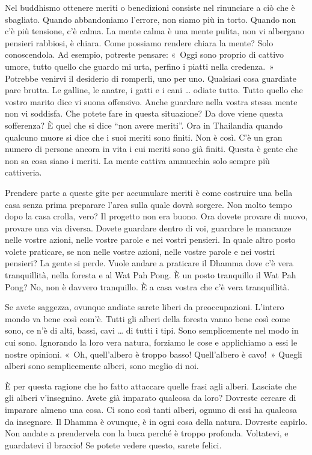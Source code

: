 Nel buddhismo ottenere meriti o benedizioni consiste nel rinunciare a
ciò che è sbagliato. Quando abbandoniamo l'errore, non siamo più in
torto. Quando non c'è più tensione, c'è calma. La mente calma è una
mente pulita, non vi albergano pensieri rabbiosi, è chiara. Come
possiamo rendere chiara la mente? Solo conoscendola. Ad esempio,
potreste pensare: «~Oggi sono proprio di cattivo umore, tutto quello che
guardo mi urta, perfino i piatti nella credenza.~» Potrebbe venirvi il
desiderio di romperli, uno per uno. Qualsiasi cosa guardiate pare
brutta. Le galline, le anatre, i gatti e i cani \ldots{} odiate tutto. Tutto
quello che vostro marito dice vi suona offensivo. Anche guardare nella
vostra stessa mente non vi soddisfa. Che potete fare in questa
situazione? Da dove viene questa sofferenza? È quel che si dice ``non
avere meriti''. Ora in Thailandia quando qualcuno muore si dice che i
suoi meriti sono finiti. Non è così. C'è un gran numero di persone
ancora in vita i cui meriti sono già finiti. Questa è gente che non sa
cosa siano i meriti. La mente cattiva ammucchia solo sempre più
cattiveria.

Prendere parte a queste gite per accumulare meriti è come costruire una
bella casa senza prima preparare l'area sulla quale dovrà sorgere. Non
molto tempo dopo la casa crolla, vero? Il progetto non era buono. Ora
dovete provare di nuovo, provare una via diversa. Dovete guardare dentro
di voi, guardare le mancanze nelle vostre azioni, nelle vostre parole e
nei vostri pensieri. In quale altro posto volete praticare, se non nelle
vostre azioni, nelle vostre parole e nei vostri pensieri? La gente si
perde. Vuole andare a praticare il Dhamma dove c'è vera tranquillità,
nella foresta e al Wat Pah Pong. È un posto tranquillo il Wat Pah Pong?
No, non è davvero tranquillo. È a casa vostra che c'è vera tranquillità.

Se avete saggezza, ovunque andiate sarete liberi da preoccupazioni.
L'intero mondo va bene così com'è. Tutti gli alberi della foresta vanno
bene così come sono, ce n'è di alti, bassi, cavi \ldots{} di tutti i tipi.
Sono semplicemente nel modo in cui sono. Ignorando la loro vera natura,
forziamo le cose e applichiamo a essi le nostre opinioni. «~Oh,
quell'albero è troppo basso! Quell'albero è cavo!~» Quegli alberi sono
semplicemente alberi, sono meglio di noi.

È per questa ragione che ho fatto attaccare quelle frasi agli alberi.
Lasciate che gli alberi v'insegnino. Avete già imparato qualcosa da
loro? Dovreste cercare di imparare almeno una cosa. Ci sono così tanti
alberi, ognuno di essi ha qualcosa da insegnare. Il Dhamma è ovunque, è
in ogni cosa della natura. Dovreste capirlo. Non andate a prendervela
con la buca perché è troppo profonda. Voltatevi, e guardatevi il
braccio! Se potete vedere questo, sarete felici.

